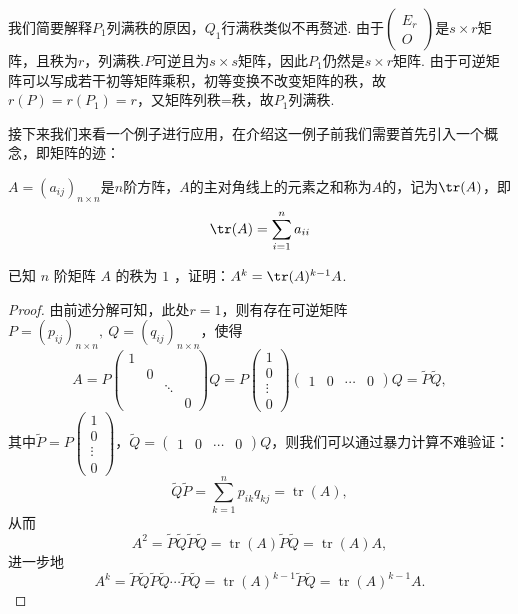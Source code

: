 我们简要解释$P_1$列满秩的原因，$Q_1$行满秩类似不再赘述. 由于$\begin{pmatrix}
        E_r \\ O
    \end{pmatrix}$是$s\times r$矩阵，且秩为$r$，列满秩.$P$可逆且为$s\times s$矩阵，因此$P_1$仍然是$s\times r$矩阵. 由于可逆矩阵可以写成若干初等矩阵乘积，初等变换不改变矩阵的秩，故$r(P)=r(P_1)=r$，又矩阵列秩=秩，故$P_1$列满秩.

接下来我们来看一个例子进行应用，在介绍这一例子前我们需要首先引入一个概念，即矩阵的迹：
\begin{definition}[{\keyterm{迹}[trace]}]
    $A=(a_{ij})_{n\times n}$是$n$阶方阵，$A$的主对角线上的元素之和称为$A$的，记为$\tr(A)$，即
    \[\tr(A)=\sum_{i=1}^n a_{ii}\]
\end{definition}

\begin{example}\label{ex:11:相抵分解}
    已知 $n$ 阶矩阵 $A$ 的秩为 $1$ ，证明：$A^k=\tr(A)^{k-1}A$.
\end{example}

\begin{proof}
    由前述分解可知，此处$r=1$，则有存在可逆矩阵 $P=\left(p_{i j}\right)_{n \times n},\ Q=\left(q_{i j}\right)_{n \times n}$，使得
    \[A=P\left(\begin{array}{cccc}
        1 & & & \\
        & 0 & & \\
        & & \ddots & \\
        & & & 0
    \end{array}\right) Q=P\left(\begin{array}{c}
        1 \\ 0 \\ \vdots \\ 0
    \end{array}\right)\left(\begin{array}{llll}
        1 & 0 & \cdots & 0
    \end{array}\right) Q=\widetilde{P} \widetilde{Q},\]
    其中$\widetilde{P}=P\left(\begin{array}{c}
        1 \\ 0 \\ \vdots \\ 0
    \end{array}\right)$，$\widetilde{Q}=\left(\begin{array}{llll}
        1 & 0 & \cdots & 0
    \end{array}\right) Q$，则我们可以通过暴力计算不难验证：
    \[\widetilde{Q} \widetilde{P}=\sum_{k=1}^{n} p_{i k} q_{k j}=\operatorname{tr}(A),\]
    从而
    \[A^{2}=\widetilde{P} \widetilde{Q} \widetilde{P} \widetilde{Q}=\operatorname{tr}(A) \widetilde{P} \widetilde{Q}=\operatorname{tr}(A) A,\]
    进一步地
    \[A^{k}=\widetilde{P} \widetilde{Q} \widetilde{P} \widetilde{Q} \cdots \widetilde{P} \widetilde{Q}=\operatorname{tr}(A)^{k-1} \widetilde{P} \widetilde{Q}=\operatorname{tr}(A)^{k-1} A.\]
\end{proof}

